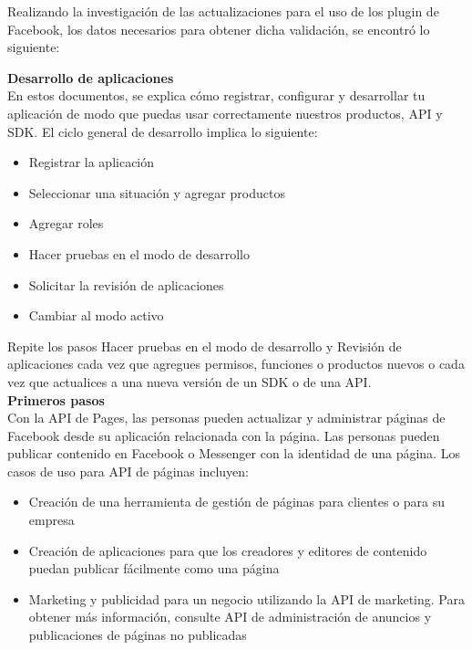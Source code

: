 	\noindent Realizando la investigación de las actualizaciones para el uso de los plugin de Facebook,
	los datos necesarios para obtener dicha validación, se encontró lo siguiente: \\
	\pagebreak
	
	\textbf{Desarrollo de aplicaciones} \\
	
	En estos documentos, se explica cómo registrar, configurar y desarrollar tu aplicación de modo
	que puedas usar correctamente nuestros productos, API y SDK.
	El ciclo general de desarrollo implica lo siguiente:
	\begin{itemize}
		\item Registrar la aplicación
		\item Seleccionar una situación y agregar productos
		\item Agregar roles
		\item Hacer pruebas en el modo de desarrollo
		\item Solicitar la revisión de aplicaciones
		\item Cambiar al modo activo
	\end{itemize}
	\noindent Repite los pasos Hacer pruebas en el modo de desarrollo y Revisión de
	aplicaciones cada vez que agregues permisos, funciones o productos nuevos o cada vez que
	actualices a una nueva versión de un SDK o de una API.\\
	
	\textbf{Primeros pasos}\\
	Con la API de Pages, las personas pueden actualizar y administrar páginas de Facebook desde su
	aplicación relacionada con la página. Las personas pueden publicar contenido en Facebook o
	Messenger con la identidad de una página. Los casos de uso para API de páginas incluyen:
	\begin{itemize}
		\item Creación de una herramienta de gestión de páginas para clientes o para su
		empresa
		\item Creación de aplicaciones para que los creadores y editores de contenido
		puedan publicar fácilmente como una página
		\item Marketing y publicidad para un negocio utilizando la API de marketing. Para
		obtener más información, consulte API de administración de anuncios y publicaciones de
		páginas no publicadas
		
	\end{itemize}
	

